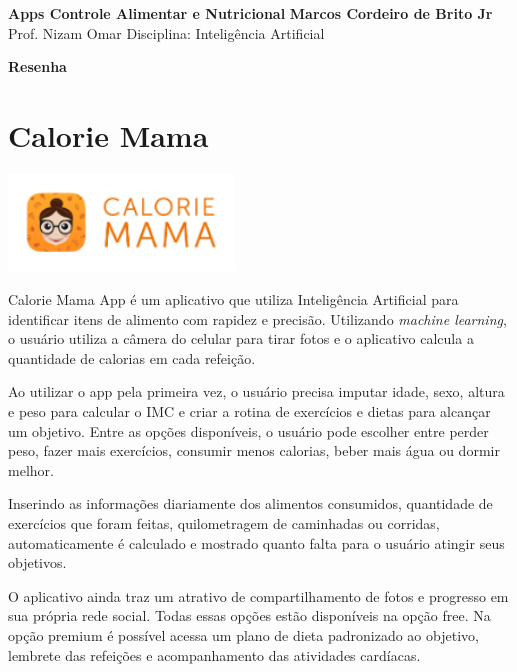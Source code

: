 \documentclass[a4paper, 11pt]{article}
\begin{document}
\noindent
\large\textbf{Apps Controle Alimentar e Nutricional} \hfill \textbf{Marcos Cordeiro de Brito Jr} \\
Prof. Nizam Omar
Disciplina: Inteligência Artificial

\begin{center}
\huge\textbf{Resenha}
\end{center}

\section{Calorie Mama}
\begin{center}
    \includegraphics[width=6cm]{calories_mama.png}
\end{center} 

\textsf{Calorie Mama App} é um aplicativo que utiliza Inteligência Artificial para identificar itens de alimento com rapidez e precisão. Utilizando \textit{machine learning}, o usuário utiliza a câmera do celular para tirar fotos e o aplicativo calcula a quantidade de calorias em cada refeição.

Ao utilizar o app pela primeira vez, o usuário precisa imputar idade, sexo, altura e peso para calcular o IMC e criar a rotina de exercícios e dietas para alcançar um objetivo.  Entre as opções disponíveis, o usuário pode escolher entre perder peso, fazer mais exercícios, consumir menos calorias, beber mais água ou dormir melhor.

Inserindo as informações diariamente dos alimentos consumidos, quantidade de exercícios que foram feitas, quilometragem de caminhadas ou corridas, automaticamente é calculado e mostrado quanto falta para o usuário atingir seus objetivos.

O aplicativo ainda traz um atrativo de compartilhamento de fotos e progresso em sua própria rede social. Todas essas opções estão disponíveis na opção free. Na opção premium é possível acessa um plano de dieta padronizado ao objetivo, lembrete das refeições e acompanhamento das atividades cardíacas. 
\end{document}
